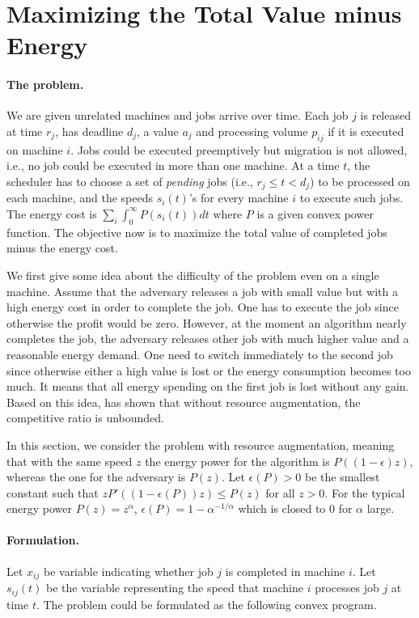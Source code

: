 \documentclass[11pt]{article}
\begin{document}
\section{Maximizing the Total Value minus Energy}		\label{sec:values-energy}

\paragraph{The problem.}
We are given unrelated machines and jobs arrive over time. 
Each job $j$ is released at time $r_{j}$, has deadline $d_{j}$, a value $a_{j}$ 
and processing volume $p_{ij}$ if it is executed on machine $i$. 
Jobs could be executed preemptively but migration is not allowed, i.e., no job 
could be executed in more than one machine. 
At a time $t$, the scheduler has to choose a set of \emph{pending} jobs (i.e., $r_{j} \leq t < d_{j}$)  
to be processed on each machine, and 
the speeds $s_{i}(t)$'s for every machine $i$ to execute such jobs.  
The energy cost is $\sum_{i} \int_{0}^{\infty} P(s_{i}(t))dt$ where $P$ is a given convex power function.
The objective now is to maximize the total value of completed jobs minus the energy cost. 

We first give some idea about the difficulty of the problem even on a single machine. 
Assume that the adversary releases a job with small value but with a high energy 
cost in order to complete the job. One has to execute the job since otherwise the profit would be zero.
However, at the moment an algorithm nearly completes the job, the adversary releases
other job with much higher value and a reasonable energy demand. One need to switch immediately 
to the second job since otherwise either a high value is lost or the energy consumption becomes 
too much. It means that all energy spending on the first job is lost without any gain. 
Based on this idea, \cite{PruhsStein10:How-to-Schedule-When} has shown that 
without resource augmentation, the competitive ratio 
is unbounded. 

In this section, we consider the problem with resource augmentation, meaning that 
with the same speed $z$ the energy power for the algorithm is $P((1-\epsilon)z)$, 
whereas the one for the adversary is $P(z)$. 
Let $\epsilon(P) > 0$ be the smallest constant such that $zP'((1-\epsilon(P))z) \leq P(z)$ for 
all $z > 0$. For the typical energy power $P(z) = z^{\alpha}$, $\epsilon(P) = 1 - \alpha^{-1/\alpha}$
which is closed to 0 for $\alpha$ large.


\paragraph{Formulation.} Let $x_{ij}$ be variable indicating whether job $j$ is completed
in machine $i$. 
Let $s_{ij}(t)$ be the variable representing the speed
that machine $i$ processes job $j$ at time $t$.   
The problem could be formulated as the following convex program.
 
\end{document}
